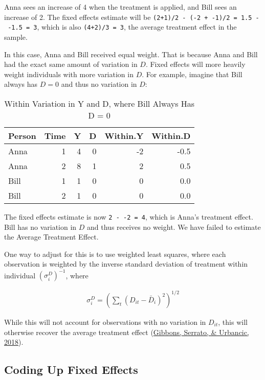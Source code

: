 \documentclass[]{book}
\theoremstyle{definition}
\theoremstyle{definition}
\theoremstyle{definition}
\theoremstyle{remark}
\begin{document}
Anna sees an increase of 4 when the treatment is applied, and Bill sees
an increase of 2. The fixed effects estimate will be
\texttt{(2+1)/2\ -\ (-2\ +\ -1)/2\ =\ 1.5\ -\ -1.5\ =\ 3}, which is also
\texttt{(4+2)/3\ =\ 3}, the average treatment effect in the sample.

In this case, Anna and Bill received equal weight. That is because Anna
and Bill had the exact same amount of variation in \(D\). Fixed effects
will more heavily weight individuals with more variation in \(D\). For
example, imagine that Bill always has \(D = 0\) and thus no variation in
\(D\):

\begin{table}[t]

\caption{\label{tab:unnamed-chunk-15}Within Variation in Y and D, where Bill Always Has D = 0}
\centering
\begin{tabular}{l|r|r|r|r|r}
\hline
Person & Time & Y & D & Within.Y & Within.D\\
\hline
Anna & 1 & 4 & 0 & -2 & -0.5\\
\hline
Anna & 2 & 8 & 1 & 2 & 0.5\\
\hline
Bill & 1 & 1 & 0 & 0 & 0.0\\
\hline
Bill & 2 & 1 & 0 & 0 & 0.0\\
\hline
\end{tabular}
\end{table}

The fixed effects estimate is now \texttt{2\ -\ -2\ =\ 4}, which is
Anna's treatment effect. Bill has no variation in \(D\) and thus
receives no weight. We have failed to estimate the Average Treatment
Effect.

One way to adjust for this is to use weighted least squares, where each
observation is weighted by the inverse standard deviation of treatment
within individual \((\sigma^D_i)^{-1}\), where

\begin{align}
  \sigma^D_i = (\sum_t(D_{it} - \bar{D}_i)^2)^{1/2} \label{eq:fe5}
\end{align}

While this will not account for observations with no variation in
\(D_{it}\), this will otherwise recover the average treatment effect
(\href{https://www.degruyter.com/view/j/jem.2019.8.issue-1/jem-2017-0002/jem-2017-0002.xml}{Gibbons,
Serrato, \& Urbancic, 2018}).

\subsection{Coding Up Fixed Effects}\label{coding-up-fixed-effects}
\end{document}
